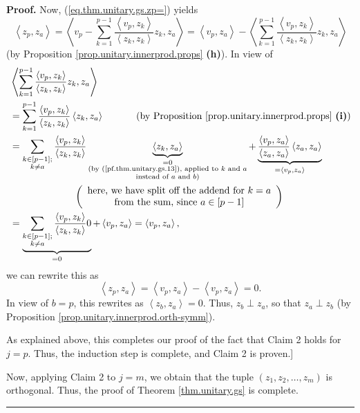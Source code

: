 \documentclass[numbers=enddot,12pt,final,onecolumn,notitlepage]{scrartcl}%
\numberwithin{exer}{subsection}
\theoremstyle{definition}
\newenvironment{proof}[1][Proof]{\noindent\textbf{#1.} }{\ \rule{0.5em}{0.5em}}
\let\sumnonlimits\sum
\renewcommand{\sum}{\sumnonlimits\limits}
\begin{document}
\begin{proof}
Now, (\ref{eq.thm.unitary.gs.zp=}) yields%
\[
\left\langle z_{p},z_{a}\right\rangle =\left\langle v_{p}-\sum_{k=1}%
^{p-1}\dfrac{\left\langle v_{p},z_{k}\right\rangle }{\left\langle z_{k}%
,z_{k}\right\rangle }z_{k},z_{a}\right\rangle =\left\langle v_{p}%
,z_{a}\right\rangle -\left\langle \sum_{k=1}^{p-1}\dfrac{\left\langle
v_{p},z_{k}\right\rangle }{\left\langle z_{k},z_{k}\right\rangle }z_{k}%
,z_{a}\right\rangle
\]
(by Proposition \ref{prop.unitary.innerprod.props} \textbf{(h)}). In view of%
\begin{align*}
&  \left\langle \sum_{k=1}^{p-1}\dfrac{\left\langle v_{p},z_{k}\right\rangle
}{\left\langle z_{k},z_{k}\right\rangle }z_{k},z_{a}\right\rangle \\
&  =\sum_{k=1}^{p-1}\dfrac{\left\langle v_{p},z_{k}\right\rangle
}{\left\langle z_{k},z_{k}\right\rangle }\left\langle z_{k},z_{a}\right\rangle
\ \ \ \ \ \ \ \ \ \ \left(  \text{by Proposition
\ref{prop.unitary.innerprod.props} \textbf{(i)}}\right) \\
&  =\sum_{\substack{k\in\left[  p-1\right]  ;\\k\neq a}}\dfrac{\left\langle
v_{p},z_{k}\right\rangle }{\left\langle z_{k},z_{k}\right\rangle
}\underbrace{\left\langle z_{k},z_{a}\right\rangle }_{\substack{=0\\\text{(by
(\ref{pf.thm.unitary.gs.13}), applied to }k\text{ and }a\\\text{instead of
}a\text{ and }b\text{)}}}+\underbrace{\dfrac{\left\langle v_{p},z_{a}%
\right\rangle }{\left\langle z_{a},z_{a}\right\rangle }\left\langle
z_{a},z_{a}\right\rangle }_{=\left\langle v_{p},z_{a}\right\rangle }\\
&  \ \ \ \ \ \ \ \ \ \ \ \ \ \ \ \ \ \ \ \ \left(
\begin{array}
[c]{c}%
\text{here, we have split off the addend for }k=a\\
\text{from the sum, since }a\in\left[  p-1\right]
\end{array}
\right) \\
&  =\underbrace{\sum_{\substack{k\in\left[  p-1\right]  ;\\k\neq a}%
}\dfrac{\left\langle v_{p},z_{k}\right\rangle }{\left\langle z_{k}%
,z_{k}\right\rangle }0}_{=0}+\left\langle v_{p},z_{a}\right\rangle
=\left\langle v_{p},z_{a}\right\rangle ,
\end{align*}
we can rewrite this as%
\[
\left\langle z_{p},z_{a}\right\rangle =\left\langle v_{p},z_{a}\right\rangle
-\left\langle v_{p},z_{a}\right\rangle =0.
\]
In view of $b=p$, this rewrites as $\left\langle z_{b},z_{a}\right\rangle =0$.
Thus, $z_{b}\perp z_{a}$, so that $z_{a}\perp z_{b}$ (by Proposition
\ref{prop.unitary.innerprod.orth-symm}).

As explained above, this completes our proof of the fact that Claim 2 holds
for $j=p$. Thus, the induction step is complete, and Claim 2 is proven.]

Now, applying Claim 2 to $j=m$, we obtain that the tuple $\left(  z_{1}%
,z_{2},\ldots,z_{m}\right)  $ is orthogonal. Thus, the proof of Theorem
\ref{thm.unitary.gs} is complete.
\end{proof}
\end{document}
